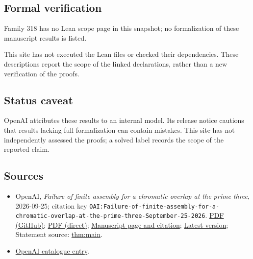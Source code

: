 \documentclass[11pt]{article}
\begin{document}
\subsection{Formal verification}
Family 318 has no Lean scope page in this snapshot; no formalization of these manuscript results is listed.

This site has not executed the Lean files or checked their dependencies. These descriptions report the scope of the linked declarations, rather than a new verification of the proofs.

\subsection{Status caveat}
OpenAI attributes these results to an internal model. Its release notice cautions that results lacking full formalization can contain mistakes. This site has not independently assessed the proofs; a solved label records the scope of the reported claim.

\subsection{Sources}
\begin{itemize}
\item OpenAI, \emph{Failure of finite assembly for a chromatic overlap at the prime three}, 2026-09-25; citation key \texttt{OAI:Failure-of-finite-assembly-for-a-chromatic-overlap-at-the-prime-three-September-25-2026}. \href{https://github.com/openai/math/blob/adc7f1241b42e322a6451854ab7e4b4c146bf78a/preprints/Failure-of-finite-assembly-for-a-chromatic-overlap-at-the-prime-three-September-25-2026/paper.pdf}{PDF (GitHub)}; \href{https://github.com/openai/math/raw/adc7f1241b42e322a6451854ab7e4b4c146bf78a/preprints/Failure-of-finite-assembly-for-a-chromatic-overlap-at-the-prime-three-September-25-2026/paper.pdf}{PDF (direct)}; \href{https://github.com/openai/math/blob/adc7f1241b42e322a6451854ab7e4b4c146bf78a/preprints/Failure-of-finite-assembly-for-a-chromatic-overlap-at-the-prime-three-September-25-2026/README.md}{Manuscript page and citation}; \href{https://github.com/openai/math/blob/main/preprints/Failure-of-finite-assembly-for-a-chromatic-overlap-at-the-prime-three-September-25-2026/paper.pdf}{Latest version}; Statement source: \href{https://github.com/openai/math/blob/adc7f1241b42e322a6451854ab7e4b4c146bf78a/preprints/Failure-of-finite-assembly-for-a-chromatic-overlap-at-the-prime-three-September-25-2026/build/sections/01-introduction.tex\#L36}{thm:main}.
\item \href{https://github.com/openai/math/blob/adc7f1241b42e322a6451854ab7e4b4c146bf78a/CONTENTS.md}{OpenAI catalogue entry}.
\end{itemize}
\end{document}
